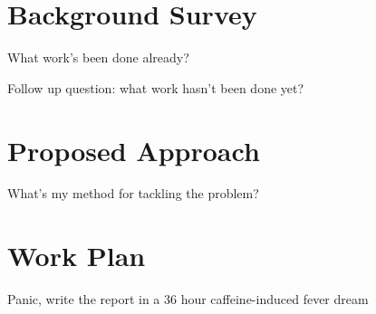 \documentclass{mprop}
\begin{document}
\section{Background Survey}

What work's been done already? 

Follow up question: what work hasn't been done yet?

\section{Proposed Approach}

What's my method for tackling the problem?

\section{Work Plan}

Panic, write the report in a 36 hour caffeine-induced fever dream



\end{document}
